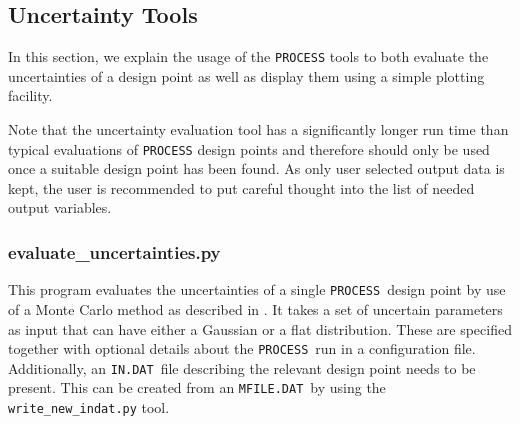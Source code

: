 \documentclass[10pt,a4paper]{article}
\newcommand{\process}{\mbox{\texttt{PROCESS}}}
\newcommand{\mfile}{\mbox{\texttt{MFILE.DAT}}}
\newcommand{\indat}{\mbox{\texttt{IN.DAT}}}
\begin{document}


\subsection{Uncertainty Tools}

In this section, we explain the usage of the \process\/ tools to both evaluate the uncertainties of a design point as well as display them using a simple plotting facility.

Note that the uncertainty evaluation tool has a significantly longer run time than typical evaluations of \process\/ design points and therefore should only be used once a suitable design point has been found.  As only user selected output data is kept, the user is recommended to put careful thought into the list of needed output variables.

\subsubsection{evaluate\_uncertainties.py}
This program evaluates the uncertainties of a single \process\ design point by use of a Monte Carlo method as described in \cite{WPPMI2014Report}. It takes a set of uncertain parameters as input that can have either a Gaussian or a flat distribution. These are specified together with optional details about the \process\ run in a configuration file. Additionally, an \indat\ file describing the relevant design point needs to be present. This can be created from an \mfile\ by using the \texttt{write\_new\_indat.py} tool.
\end{document}
